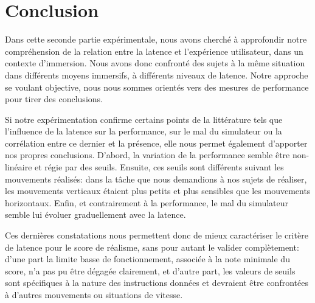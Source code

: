 \chapter*{Conclusion}
\par Dans cette seconde partie expérimentale, nous avons cherché à approfondir notre compréhension de la relation entre la latence et l'expérience utilisateur, dans un contexte d'immersion. Nous avons donc confronté des sujets à la même situation dans différents moyens immersifs, à différents niveaux de latence. Notre approche se voulant objective, nous nous sommes orientés vers des mesures de performance pour tirer des conclusions.

\par Si notre expérimentation confirme certains points de la littérature tels que l'influence de la latence sur la performance, sur le mal du simulateur ou la corrélation entre ce dernier et la présence, elle nous permet également d'apporter nos propres conclusions. D'abord, la variation de la performance semble être non-linéaire et régie par des seuils. Ensuite, ces seuils sont différents suivant les mouvements réalisés: dans la tâche que nous demandions à nos sujets de réaliser, les mouvements verticaux étaient plus petits et plus sensibles que les mouvements horizontaux. Enfin, et contrairement à la performance, le mal du simulateur semble lui évoluer graduellement avec la latence.

\par Ces dernières constatations nous permettent donc de mieux caractériser le critère de latence pour le score de réalisme, sans pour autant le valider complètement: d'une part la limite basse de fonctionnement, associée à la note minimale du score, n'a pas pu être dégagée clairement, et d'autre part, les valeurs de seuils sont spécifiques à la nature des instructions données et devraient être confrontées à d'autres mouvements ou situations de vitesse.
